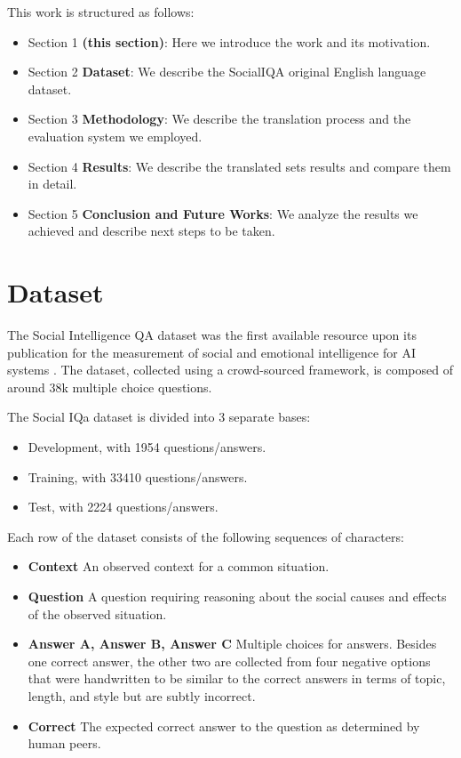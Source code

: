 \documentclass{article}
\begin{document}
This work is structured as follows:
\begin{itemize}
    \item Section 1 \textbf{(this section)}: Here we introduce the work and its
    motivation.
    \item Section 2 \textbf{Dataset}: We describe the SocialIQA original English
    language dataset.
    \item Section 3 \textbf{Methodology}: We describe the translation process
    and the evaluation system we employed.
    \item Section 4 \textbf{Results}: We describe the translated sets results
    and compare them in detail.
    \item Section 5 \textbf{Conclusion and Future Works}: We analyze the results
    we achieved and describe next steps to be taken.
\end{itemize}

\section{Dataset}
The Social Intelligence QA dataset was the first available resource upon its
publication for the measurement of social and emotional intelligence for AI
systems \cite{socialiqa}. The dataset, collected using a crowd-sourced
framework, is composed of around 38k multiple choice questions.

The Social IQa dataset is divided into 3 separate bases:
\begin{itemize}
    \item Development, with 1954 questions/answers.
    \item Training, with 33410 questions/answers.
    \item Test, with 2224 questions/answers.
\end{itemize}

Each row of the dataset consists of the following sequences of characters:

\begin{itemize}
    \item \textbf{Context} An observed context for a common situation.
    \item \textbf{Question} A question requiring reasoning about the social
    causes and effects of the observed situation.
    \item \textbf{Answer A, Answer B, Answer C} Multiple choices for answers.
    Besides one correct answer, the other two are collected from four negative
    options that were handwritten to be similar to the correct answers in terms
    of topic, length, and style but are subtly incorrect.
    \item \textbf{Correct} The expected correct answer to the question as
    determined by human peers.
\end{itemize}
\end{document}
